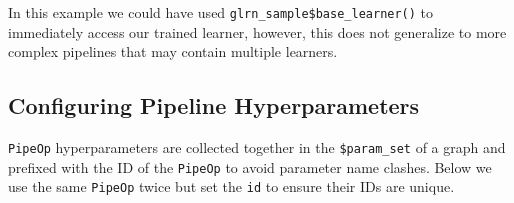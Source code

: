 \begin{tcolorbox}[enhanced jigsaw, opacitybacktitle=0.6, rightrule=.15mm, opacityback=0, arc=.35mm, breakable, titlerule=0mm, colframe=quarto-callout-tip-color-frame, coltitle=black, bottomrule=.15mm, toprule=.15mm, colback=white, colbacktitle=quarto-callout-tip-color!10!white, bottomtitle=1mm, toptitle=1mm, title=\textcolor{quarto-callout-tip-color}{\faLightbulb}\hspace{0.5em}{\texttt{\$base\_learner()}}, leftrule=.75mm, left=2mm]

In this example we could have used
\texttt{glrn\_sample\$base\_learner()} to immediately access our trained
learner, however, this does not generalize to more complex pipelines
that may contain multiple learners.

\end{tcolorbox}

\hypertarget{configuring-pipeline-hyperparameters}{%
\subsection{Configuring Pipeline
Hyperparameters}\label{configuring-pipeline-hyperparameters}}

\texttt{PipeOp} hyperparameters are collected together in the
\texttt{\$param\_set} of a graph and prefixed with the ID of the
\texttt{PipeOp} to avoid parameter name clashes. Below we use the same
\texttt{PipeOp} twice but set the \texttt{id} to ensure their IDs are
unique.

\begin{Shaded}
\begin{Highlighting}[]
\OtherTok{=} \NormalTok{(}\NormalTok{, } \NormalTok{, } \NormalTok{, } \NormalTok{) }\SpecialCharTok{\%\textgreater{}\textgreater{}\%}
  \NormalTok{(}\NormalTok{, } \NormalTok{, } \NormalTok{, } \NormalTok{) }\SpecialCharTok{\%\textgreater{}\textgreater{}\%}
  \NormalTok{(}\NormalTok{, } \NormalTok{)}
\SpecialCharTok{$}\SpecialCharTok{$}
\end{Highlighting}
\end{Shaded}

